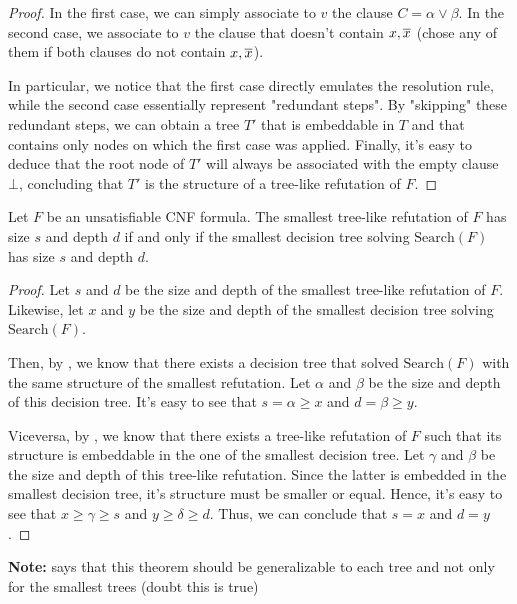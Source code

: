 \begin{proof}
    In the first case, we can simply associate to $v$ the clause $C = \alpha \lor \beta$.  In the second case, we associate to $v$ the clause that doesn't contain $x, \overline{x}$ (chose any of them if both clauses do not contain $x, \overline{x}$).

    In particular, we notice that the first case directly emulates the resolution rule, while the second case essentially represent "redundant steps". By "skipping" these redundant steps, we can obtain a tree $T'$ that is embeddable in $T$ and that contains only nodes on which the first case was applied. Finally, it's easy to deduce that the root node of $T'$ will always be associated with the empty clause $\bot$, concluding that $T'$ is the structure of a tree-like refutation of $F$.

\end{proof}

\begin{theorem}
Let $F$ be an unsatisfiable CNF formula. The smallest tree-like refutation of $F$ has size $s$ and depth $d$ if and only if the smallest decision tree solving $\mathrm{Search}(F)$ has size $s$ and depth $d$.
\end{theorem}

\begin{proof}
    Let $s$ and $d$ be the size and depth of the smallest tree-like refutation of $F$. Likewise, let $x$ and $y$ be the size and depth of the smallest decision tree solving $\mathrm{Search}(F)$.

    Then, by , we know that there exists a decision tree that solved $\mathrm{Search}(F)$ with the same structure of the smallest refutation. Let $\alpha$ and $\beta$ be the size and depth of this decision tree. It's easy to see that $s = \alpha \geq x$ and $d = \beta \geq y$.

    Viceversa, by , we know that there exists a tree-like refutation of $F$ such that its structure is embeddable in the one of the smallest decision tree. Let $\gamma$ and $\beta$ be the size and depth of this tree-like refutation. Since the latter is embedded in the smallest decision tree, it's structure must be smaller or equal. Hence, it's easy to see that $x \geq \gamma \geq s$ and $y \geq \delta \geq d$. Thus, we can conclude that $s = x$ and $d = y$.

\end{proof}

\textbf{Note:} \cite{proofs_circuits_communication} says that this theorem should be generalizable to each tree and not only for the smallest trees (doubt this is true)

